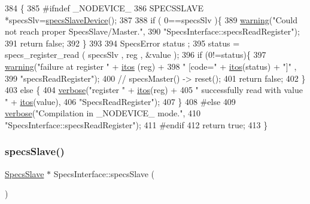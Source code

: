 \begin{DoxyCode}
384                                                  \{
385 \textcolor{preprocessor}{#ifndef \_NODEVICE\_
}
386   SPECSSLAVE *specsSlv=\hyperlink{classSpecsInterface_ac8d4711197f484f055533ec1e5ae01a1}{specsSlaveDevice}();
387 
388   \textcolor{keywordflow}{if} ( 0==specsSlv  )\{
389     \hyperlink{classObject_a65cd4fda577711660821fd2cd5a3b4c9}{warning}(\textcolor{stringliteral}{"Could not reach proper SpecsSlave/Master."},
390             \textcolor{stringliteral}{"SpecsInterface::specsReadRegister"});
391     \textcolor{keywordflow}{return} \textcolor{keyword}{false};
392   \}
393   
394   SpecsError status ;
395   status = specs\_register\_read ( specsSlv , reg , &value );
396   \textcolor{keywordflow}{if} (0!=status)\{
397     \hyperlink{classObject_a65cd4fda577711660821fd2cd5a3b4c9}{warning}(\textcolor{stringliteral}{"failure at register "} + \hyperlink{Tools_8h_af330027dbdafb9a30768b3613c553e60}{itos} (reg) +
398             \textcolor{stringliteral}{" [code="} + \hyperlink{Tools_8h_af330027dbdafb9a30768b3613c553e60}{itos}(status) + \textcolor{stringliteral}{"]"} ,
399             \textcolor{stringliteral}{"specsReadRegister"});
400     \textcolor{comment}{//    specsMaster() -> reset();}
401     \textcolor{keywordflow}{return} \textcolor{keyword}{false};
402   \}
403   \textcolor{keywordflow}{else} \{
404     \hyperlink{classObject_a83d2db2df682907ea1115ad721c1c4a1}{verbose}(\textcolor{stringliteral}{"register "} + \hyperlink{Tools_8h_af330027dbdafb9a30768b3613c553e60}{itos}(reg) +
405             \textcolor{stringliteral}{" successfully read with value "} + \hyperlink{Tools_8h_af330027dbdafb9a30768b3613c553e60}{itos}(value),
406             \textcolor{stringliteral}{"SpecsReadRegister"});
407   \}
408 \textcolor{preprocessor}{#else
}
409   \hyperlink{classObject_a83d2db2df682907ea1115ad721c1c4a1}{verbose}(\textcolor{stringliteral}{"Compilation in \_NODEVICE\_ mode."},
410           \textcolor{stringliteral}{"SpecsInterface::specsReadRegister"});
411 \textcolor{preprocessor}{#endif
}
412   \textcolor{keywordflow}{return} \textcolor{keyword}{true};
413 \}
\end{DoxyCode}
\mbox{\label{classSpecsInterface_a13cf39bddfa8ba21d6e6aa78e78f0e4f}} 
\subsubsection{\texorpdfstring{specs\+Slave()}{specsSlave()}}
{\footnotesize\ttfamily \hyperlink{classSpecsSlave}{Specs\+Slave} $\ast$ Specs\+Interface\+::specs\+Slave (\begin{DoxyParamCaption}{ }\end{DoxyParamCaption})\hspace{0.3cm}{\ttfamily [virtual]}}

